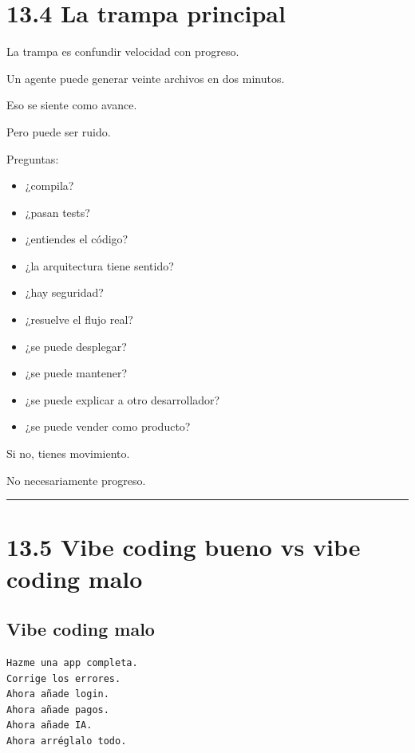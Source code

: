 \section{13.4 La trampa principal}\label{la-trampa-principal}

La trampa es confundir velocidad con progreso.

Un agente puede generar veinte archivos en dos minutos.

Eso se siente como avance.

Pero puede ser ruido.

Preguntas:

\begin{itemize}
\tightlist
\item
  ¿compila?
\item
  ¿pasan tests?
\item
  ¿entiendes el código?
\item
  ¿la arquitectura tiene sentido?
\item
  ¿hay seguridad?
\item
  ¿resuelve el flujo real?
\item
  ¿se puede desplegar?
\item
  ¿se puede mantener?
\item
  ¿se puede explicar a otro desarrollador?
\item
  ¿se puede vender como producto?
\end{itemize}

Si no, tienes movimiento.

No necesariamente progreso.

\begin{center}\rule{0.5\linewidth}{0.5pt}\end{center}

\section{13.5 Vibe coding bueno vs vibe coding
malo}\label{vibe-coding-bueno-vs-vibe-coding-malo}

\subsection{Vibe coding malo}\label{vibe-coding-malo}

\begin{lstlisting}
Hazme una app completa.
Corrige los errores.
Ahora añade login.
Ahora añade pagos.
Ahora añade IA.
Ahora arréglalo todo.
\end{lstlisting}

